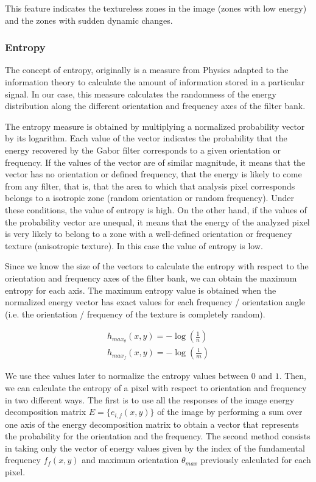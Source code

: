 This feature indicates the textureless zones in the image (zones with low energy) and the zones with sudden dynamic changes.
\subsubsection{Entropy}
The concept of entropy, originally is a measure from Physics adapted to the information theory to calculate the amount of information stored in a particular signal. In our case, this measure calculates the randomness of the energy distribution along the different orientation and frequency axes of the filter bank.

The entropy measure is obtained by multiplying a normalized probability vector by its logarithm. Each value of the vector indicates the probability that the energy recovered by the Gabor filter corresponds to a given orientation or frequency. If the values of the vector are of similar magnitude, it means that the vector has no orientation or defined frequency, that the energy is likely to come from any filter, that is, that the area to which that analysis pixel corresponds belongs to a isotropic zone (random orientation or random frequency). Under these conditions, the value of entropy is high. On the other hand, if the values of the probability vector are unequal, it means that the energy of the analyzed pixel is very likely to belong to a zone with a well-defined orientation or frequency texture (anisotropic texture). In this case the value of entropy is low.

Since we know the size of the vectors to calculate the entropy with respect to the orientation and frequency axes of the filter bank, we can obtain the maximum entropy for each axis. The maximum entropy value is obtained when the normalized energy vector has exact values for each frequency / orientation angle (i.e. the orientation / frequency of the texture is completely random).

\begin{gather}
    h_{max_{\theta}}(x,y) = -\log\left(\frac{1}{n}\right) \label{eq:max_entropy_orient} \\
    h_{max_f}(x,y) = -\log\left(\frac{1}{m}\right) \label{eq:max_entropy_freq}
\end{gather}

We use thee values later to normalize the entropy values between $0$ and $1$. Then, we can calculate the entropy of a pixel with respect to orientation and frequency in two different ways. The first is to use all the responses of the image energy decomposition matrix $E = \lbrace  e_{i,j}(x,y) \rbrace$ of the image by performing a sum over one axis of the energy decomposition matrix to obtain a vector that represents the probability for the orientation and the frequency. The second method consists in taking only the vector of energy values given by the index of the fundamental frequency $f_f(x,y)$ and maximum orientation $\theta_{max}$ previously calculated for each pixel.

